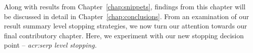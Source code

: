 Along with results from Chapter~\ref{chap:snippets}, findings from this chapter will be discussed in detail in Chapter~\ref{chap:conclusions}. From an examination of our result summary level stopping strategies, we now turn our attention towards our final contributory chapter. Here, we experiment with our new stopping decision point -- \emph{\gls{acr:serp} level stopping.}

